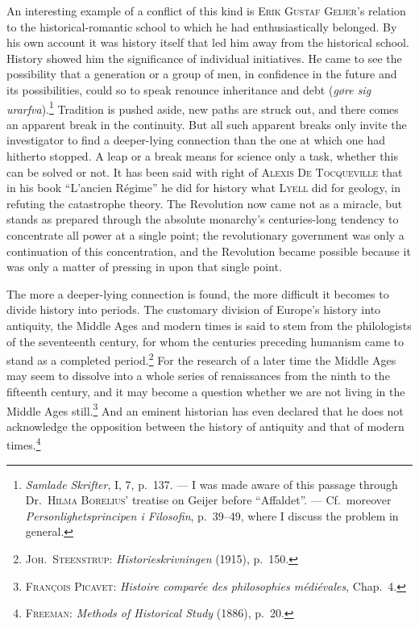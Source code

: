 \documentclass[12pt]{book}
\newcommand{\opage}[1]{\marginnote{\footnotesize\textit{[#1]}}}
\begin{document}
An interesting example of a conflict of this kind is \textsc{Erik Gustaf Geijer}'s relation
to the historical-romantic school to which he had enthusiastically belonged. \opage{63}By his own
account it was history itself that led him away from the historical school. History showed
him the significance of individual initiatives. He came to see the possibility that a
generation or a group of men, in confidence in the future and its possibilities, could so
to speak renounce inheritance and debt (\textit{gøre sig urarfva}).\footnote{\textit{Samlade
Skrifter}, I, 7, p.\ 137. --- I was made aware of this passage through Dr.\ \textsc{Hilma
Borelius}' treatise on Geijer before ``Affaldet''. --- Cf.\ moreover
\textit{Personlighetsprincipen i Filosofin}, p.\ 39--49, where I discuss the problem in
general.} Tradition is pushed aside, new paths are struck out, and there comes an apparent
break in the continuity. But all such apparent breaks only invite the investigator to find
a deeper-lying connection than the one at which one had hitherto stopped. A leap or a break
means for science only a task, whether this can be solved or not. It has been said with
right of \textsc{Alexis De Tocqueville} that in his book ``L'ancien Régime'' he did for
history what \textsc{Lyell} did for geology, in refuting the catastrophe theory. The
Revolution now came not as a miracle, but stands as prepared through the absolute monarchy's
centuries-long tendency to concentrate all power at a single point; the revolutionary
government was only a continuation of this concentration, and the Revolution became possible
because it was only a matter of pressing in upon that single point.

The more a deeper-lying connection is found, the more difficult it becomes to divide history
into periods. The customary division of Europe's history into antiquity, the Middle Ages and
modern times is said to stem from the philologists of the seventeenth century, for whom the
centuries preceding humanism came to stand as a completed period.\footnote{\textsc{Joh.\
Steenstrup}: \textit{Historieskrivningen} (1915), p.\ 150.} For the research of a later time
the Middle Ages may seem to dissolve into a whole series of renaissances from the ninth to
the fifteenth century, and it may become a question whether we are not living in the Middle
Ages still.\footnote{\textsc{François Picavet}: \textit{Histoire comparée des philosophies
médiévales}, Chap.\ 4.} And an eminent historian has even declared that he does not
acknowledge the opposition between the history of antiquity and that of modern
times.\footnote{\textsc{Freeman}: \textit{Methods of Historical Study} (1886), p.\ 20.}
\end{document}
